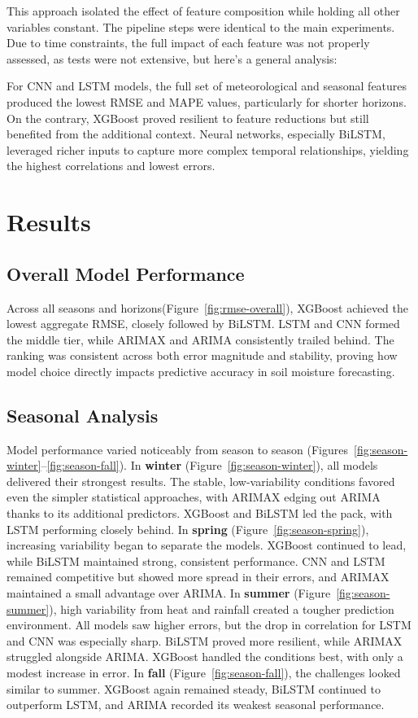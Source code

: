 \documentclass{article}
\begin{document}
This approach isolated the effect of feature composition while holding all other variables constant. The pipeline steps were identical to the main experiments. Due to time constraints, the full impact of each feature was not properly assessed, as tests were not extensive, but here's a general analysis: 

For CNN and LSTM models, the full set of meteorological and seasonal features produced the lowest RMSE and MAPE values, particularly for shorter horizons. On the contrary, XGBoost proved resilient to feature reductions but still benefited from the additional context. Neural networks, especially BiLSTM, leveraged richer inputs to capture more complex temporal relationships, yielding the highest correlations and lowest errors.


\section{Results}

\subsection{Overall Model Performance}
Across all seasons and horizons(Figure~\ref{fig:rmse-overall}), XGBoost achieved the lowest aggregate RMSE, closely followed by BiLSTM. LSTM and CNN formed the middle tier, while ARIMAX and ARIMA consistently trailed behind. The ranking was consistent across both error magnitude and stability, proving how model choice directly impacts predictive accuracy in soil moisture forecasting.

\subsection{Seasonal Analysis}
Model performance varied noticeably from season to season (Figures~\ref{fig:season-winter}--\ref{fig:season-fall}).  
In \textbf{winter} (Figure~\ref{fig:season-winter}), all models delivered their strongest results. The stable, low-variability conditions favored even the simpler statistical approaches, with ARIMAX edging out ARIMA thanks to its additional predictors. XGBoost and BiLSTM led the pack, with LSTM performing closely behind.  
In \textbf{spring} (Figure~\ref{fig:season-spring}), increasing variability began to separate the models. XGBoost continued to lead, while BiLSTM maintained strong, consistent performance. CNN and LSTM remained competitive but showed more spread in their errors, and ARIMAX maintained a small advantage over ARIMA.  
In \textbf{summer} (Figure~\ref{fig:season-summer}), high variability from heat and rainfall created a tougher prediction environment. All models saw higher errors, but the drop in correlation for LSTM and CNN was especially sharp. BiLSTM proved more resilient, while ARIMAX struggled alongside ARIMA. XGBoost handled the conditions best, with only a modest increase in error.  
In \textbf{fall} (Figure~\ref{fig:season-fall}), the challenges looked similar to summer. XGBoost again remained steady, BiLSTM continued to outperform LSTM, and ARIMA recorded its weakest seasonal performance.
\end{document}
